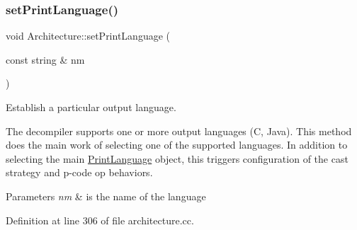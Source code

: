\subsubsection{\texorpdfstring{setPrintLanguage()}{setPrintLanguage()}}
{\footnotesize\ttfamily void Architecture\+::set\+Print\+Language (\begin{DoxyParamCaption}\item[{const string \&}]{nm }\end{DoxyParamCaption})}



Establish a particular output language. 

The decompiler supports one or more output languages (C, Java). This method does the main work of selecting one of the supported languages. In addition to selecting the main \mbox{\hyperlink{class_print_language}{Print\+Language}} object, this triggers configuration of the cast strategy and p-\/code op behaviors. 
\begin{DoxyParams}{Parameters}
{\em nm} & is the name of the language \\
\hline
\end{DoxyParams}


Definition at line 306 of file architecture.\+cc.

